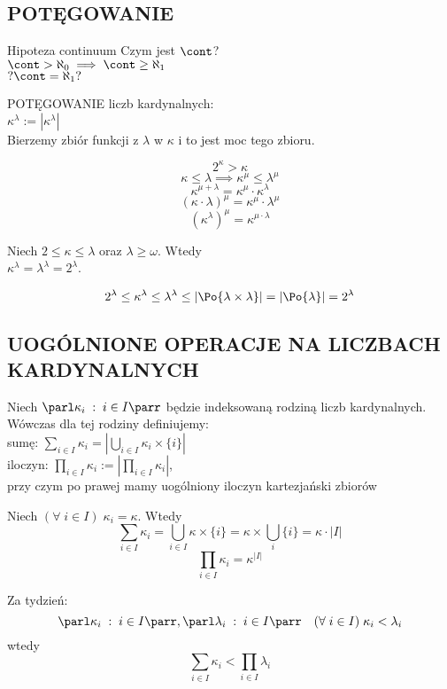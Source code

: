 \subsection{POTĘGOWANIE}
\begin{center}\large
    Hipoteza continuum
    Czym jest $\cont$?\smallskip\\
    $\cont>\aleph_0\implies\cont\geq\aleph_1$\smallskip\\
    $?\cont=\aleph_1?$
\end{center}

\begin{center}\large
    {\color{def}POTĘGOWANIE} liczb kardynalnych:\medskip\\
    $\kappa^\lambda:=|\kappa^\lambda|$\medskip\\
    Bierzemy zbiór funkcji z $\lambda$ w $\kappa$ i to jest moc tego zbioru.
\end{center}
$$2^\kappa >\kappa$$
$$\kappa\leq\lambda\implies\kappa^\mu \leq\lambda^\mu$$
$$\kappa^{\mu+\lambda}=\kappa^\mu\cdot\kappa^\lambda$$
$$(\kappa\cdot\lambda)^\mu=\kappa^\mu\cdot\lambda^\mu$$
$$(\kappa^\lambda )^\mu =\kappa^{\mu\cdot\lambda}$$

\begin{center}\large
    Niech $2\leq\kappa\leq\lambda$ oraz $\lambda\geq\omega$. Wtedy\smallskip\\
    $\kappa^\lambda=\lambda^\lambda=2^\lambda$.
\end{center}
\dowod
$$2^\lambda\leq\kappa^\lambda \leq\lambda^\lambda \leq |\Po{\lambda\times\lambda}|=|\Po{\lambda}| = 2^\lambda$$
\kondow

\subsection{UOGÓLNIONE OPERACJE NA LICZBACH KARDYNALNYCH}

\begin{center}\large
    Niech $\parl\kappa_i\;:\;i\in I\parr$ będzie indeksowaną rodziną liczb kardynalnych. \smallskip\\
    Wówczas dla tej rodziny definiujemy:\medskip\\
    {\color{def}sumę:} $\sum\limits_{i\in I}\kappa_i = |\bigcup\limits_{i\in I} \kappa_i\times\{i\}|$\medskip\\
    {\color{def}iloczyn}: $\prod\limits_{i\in I} \kappa_i:= |\prod\limits_{i\in I} \kappa_i|$, \\przy czym po prawej mamy uogólniony iloczyn kartezjański zbiorów
\end{center}

Niech $(\forall\;i\in I)\;\kappa_i=\kappa$. Wtedy
$$\sum\limits_{i\in I}\kappa_i=\bigcup\limits_{i\in I}\kappa\times\{i\} = \kappa\times\bigcup\limits_i\{i\}=\kappa\cdot|I|$$
$$\prod\limits_{i\in I}\kappa_i=\kappa^{|I|}$$

Za tydzień:
$$\parl\kappa_i\;:\;i\in I\parr,\parl\lambda_i\;:\;i\in I\parr\quad (\forall\;i\in I)\;\kappa_i<\lambda_i$$
wtedy
$$\sum\limits_{i\in I}\kappa_i<\prod\limits_{i\in I}\lambda_i$$